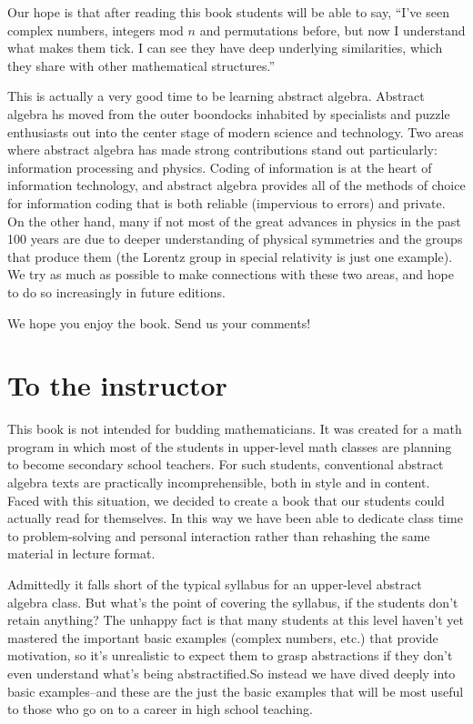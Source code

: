 Our hope is that after reading this book students will be able to say, ``I've seen complex numbers, integers mod $n$ and permutations before, but now I understand what makes them tick. I can see they have  deep underlying similarities, which they share with other mathematical structures.'' 

This is actually a very good time to be learning abstract algebra. Abstract algebra hs moved from the outer boondocks inhabited by specialists and puzzle enthusiasts out  into the center stage of modern  science and technology. Two areas where abstract algebra has made strong contributions stand out particularly: information processing and physics. Coding of information is at the heart of information technology, and abstract algebra provides all of the methods of choice for information coding that is both reliable (impervious to errors) and private.  
On the other hand,  many if not most of the great advances in  physics in the past 100 years are due to deeper understanding of physical symmetries and the groups that produce them (the Lorentz group in special relativity is just one example). We try as much as possible to make connections with these two areas, and hope to do so increasingly in future editions. 

We hope you enjoy the book. Send us your comments!

\section*{To the instructor}
\label{sec:ToTheInstructor}

This book  is not intended for budding mathematicians. It was created for a math program in which most of the students in upper-level math classes are planning to become secondary school teachers. For such students, conventional abstract algebra texts are practically  incomprehensible, both in style and in content. Faced with this situation, we decided to create a book that our students could actually read for themselves. In this way we have been able to dedicate class time to problem-solving and personal  interaction rather than rehashing the same material in lecture format.

Admittedly it falls short of the typical syllabus for an upper-level abstract algebra class. But what's the point of covering the syllabus, if the students don't retain anything?  The unhappy fact is that many students at this level haven't yet mastered the important basic examples (complex numbers, etc.) that provide motivation, so it's unrealistic to expect them to grasp abstractions if they don't even understand what's being abstractified.So instead we have dived deeply into basic examples--and these are the just the basic examples that will be most useful to those who go on to a career in high school teaching.

